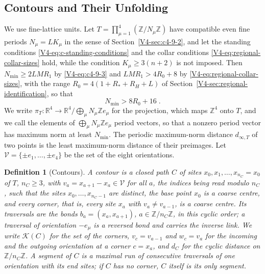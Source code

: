 \documentclass[11pt]{article}
\numberwithin{equation}{section}
\newtheorem{definition}[theorem]{Definition}
\theoremstyle{remark}
\theoremstyle{plain}
\begin{document}
\subsection{Contours and Their Unfolding}\label{sec:torus-setting}

We use fine-lattice units. Let $T=\prod_{\mu=1}^4(\mathbb Z/N_{\mu}\mathbb Z)$ have compatible even fine periods $N_{\mu}= LK_{\mu}$ in the sense of Section~\ref{V4-sec:c4-9-2}, and let the standing conditions \eqref{V4-eq:c-standing-conditions} and the collar conditions \eqref{V4-eq:regional-collar-sizes} hold, while the condition $K_{\mu}\geqslant 3(n+2)$ is not imposed. Then $N_{\min}\geqslant 2LMR_1$ by \eqref{V4-eq:c4-9-3} and $LMR_1>4R_0+8$ by \eqref{V4-eq:regional-collar-sizes}, with the range $R_0=4(1+R_*+R_H+L)$ of Section~\ref{V4-sec:regional-identification}, so that
\begin{equation}\label{eq:torus-period}
    N_{\min}>8R_0+16\;.
\end{equation}
We write $\pi_T \colon \mathbb R^4\to\mathbb R^4/\bigoplus_{\mu}N_{\mu}\mathbb Ze_{\mu}$ for the projection, which maps $\mathbb Z^4$ onto $T$, and we call the elements of $\bigoplus_{\mu}N_{\mu}\mathbb Ze_{\mu}$ period vectors, so that a nonzero period vector has maximum norm at least $N_{\min}$. The periodic maximum-norm distance $d_{\infty,T}$ of two points is the least maximum-norm distance of their preimages. Let $\mathscr V=\{\pm e_1,\ldots,\pm e_4\}$ be the set of the eight orientations.

\begin{definition}[Contours]\label{def:torus-contour}
A \emph{contour} is a closed path $C$ of sites $x_0,x_1,\ldots,x_{n_C}= x_0$ of $T$, $n_C\geqslant 3$, with $v_a= x_{a+1}-x_a\in\mathscr V$ for all $a$, the indices being read modulo $n_C$, such that the sites $x_0,\ldots,x_{n_C-1}$ are distinct, the base point $x_0$ is a coarse centre, and every \emph{corner}, that is, every site $x_a$ with $v_a\neq v_{a-1}$, is a coarse centre. Its traversals are the bonds $b_a=(x_a,x_{a+1})$, $a\in\mathbb Z/n_C\mathbb Z$, in this cyclic order; a traversal of orientation $-e_{\mu}$ is a reversed bond and carries the inverse link. We write $\mathscr K(C)$ for the set of the corners, $v_c= v_{a-1}$ and $w_c= v_a$ for the incoming and the outgoing orientation at a corner $c= x_a$, and $d_C$ for the cyclic distance on $\mathbb Z/n_C\mathbb Z$. A \emph{segment} of $C$ is a maximal run of consecutive traversals of one orientation with its end sites; if $C$ has no corner, $C$ itself is its only segment.
\end{definition}
\end{document}
